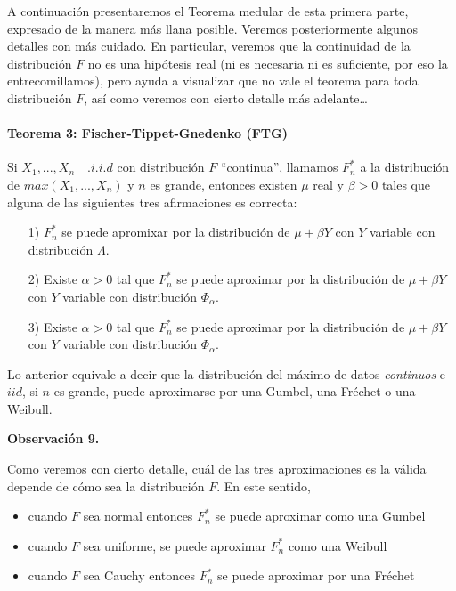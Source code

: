 \documentclass[
  oneside]{book}
\begin{document}
A continuación presentaremos el Teorema medular de esta primera parte,
expresado de la manera más llana posible. Veremos posteriormente algunos
detalles con más cuidado. En particular, veremos que la continuidad de
la distribución \(F\) no es una hipótesis real (ni es necesaria ni es
suficiente, por eso la entrecomillamos), pero ayuda a visualizar que no
vale el teorema para toda distribución \(F\), así como veremos con
cierto detalle más adelante\ldots{}

\hypertarget{teorema-3-fischer-tippet-gnedenko-ftg}{%
\paragraph{Teorema 3: Fischer-Tippet-Gnedenko
(FTG)}\label{teorema-3-fischer-tippet-gnedenko-ftg}}

Si \(X_1,...,X_n\quad .i.i.d\) con distribución \(F\) ``continua'',
llamamos \(F_n^*\) a la distribución de \(max(X_1,...,X_n)\) y \(n\) es
grande, entonces existen \(\mu\) real y \(\beta>0\) tales que alguna de
las siguientes tres afirmaciones es correcta:

\begin{itemize}
  \item[1)] $F_n^*$ se puede apromixar por la distribución de $\mu+\beta Y$ con $Y$ variable con distribución $\Lambda$.
  \item[2)] Existe $\alpha>0$ tal que $F_n^*$ se puede aproximar por la distribución de $\mu+\beta Y$ con $Y$ variable con distribución $\Phi_{\alpha}$. 
  \item[3)] Existe $\alpha>0$ tal que $F_n^*$ se puede aproximar por la distribución de $\mu+\beta Y$ con $Y$ variable con distribución $\Phi_{\alpha}$.
\end{itemize}

Lo anterior equivale a decir que la distribución del máximo de datos
\textit{continuos} e \(iid\), si \(n\) es grande, puede aproximarse por
una Gumbel, una Fréchet o una Weibull.

\textbf{Observación 9.}

Como veremos con cierto detalle, cuál de las tres aproximaciones es la
válida depende de cómo sea la distribución \(F\). En este sentido,

\begin{itemize}
\item cuando $F$ sea normal entonces $F_n^*$ se puede aproximar como una Gumbel
\item cuando $F$ sea uniforme, se puede aproximar $F_n^*$ como una Weibull
\item cuando $F$ sea Cauchy entonces $F_n^*$ se puede aproximar por una Fréchet
\end{itemize}
\end{document}
